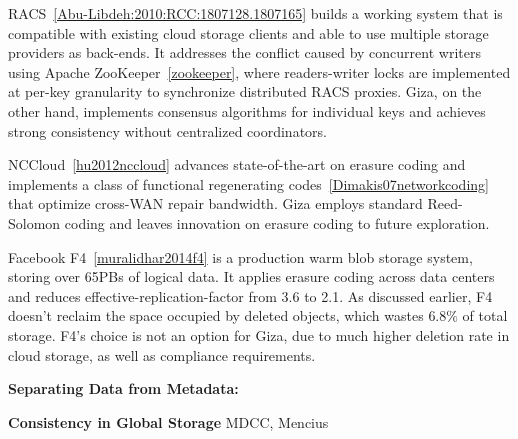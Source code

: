 RACS~\ref{Abu-Libdeh:2010:RCC:1807128.1807165} 
builds a working system that is compatible with existing cloud storage clients and able to use multiple storage providers as back-ends.
It addresses the conflict caused by concurrent writers using Apache ZooKeeper~\ref{zookeeper}, where readers-writer locks are implemented at per-key granularity to synchronize distributed RACS proxies.
Giza, on the other hand, implements consensus algorithms for individual keys and achieves strong consistency without centralized coordinators.

NCCloud~\ref{hu2012nccloud} advances state-of-the-art on erasure coding and implements a class of functional regenerating codes~\ref{Dimakis07networkcoding} that optimize cross-WAN repair bandwidth. Giza employs standard Reed-Solomon coding and leaves innovation on erasure coding to future exploration.

Facebook F4~\ref{muralidhar2014f4} is a production warm blob storage system, storing over 65PBs of logical data. It applies erasure coding across data centers and reduces effective-replication-factor from 3.6 to 2.1. As discussed earlier, F4 doesn't reclaim the space occupied by deleted objects, which wastes $6.8\%$ of total storage. F4's choice is not an option for Giza, due to much higher deletion rate in cloud storage, as well as compliance requirements.


{\bf Separating Data from Metadata:}


{\bf Consistency in Global Storage}
MDCC, Mencius

